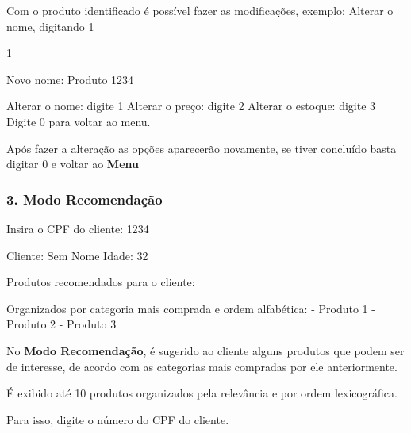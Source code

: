 


\begin{DoxyItemize}
\item Com o produto identificado é possível fazer as modificações, exemplo\+: Alterar o nome, digitando 1 ~\newline

\end{DoxyItemize}

\begin{DoxyVerb}1

Novo nome: Produto 1234

Alterar o nome: digite 1
Alterar o preço: digite 2
Alterar o estoque: digite 3
Digite 0 para voltar ao menu.
\end{DoxyVerb}



\begin{DoxyItemize}
\item Após fazer a alteração as opções aparecerão novamente, se tiver concluído basta digitar 0 e voltar ao {\bfseries Menu} 


\end{DoxyItemize}

\subsubsection*{3. Modo Recomendação}

\begin{DoxyVerb}

Insira o CPF do cliente: 1234

Cliente: Sem Nome
Idade: 32

Produtos recomendados para o cliente:

Organizados por categoria mais comprada e ordem alfabética:
- Produto 1
- Produto 2
- Produto 3
\end{DoxyVerb}



\begin{DoxyItemize}
\item No {\bfseries Modo Recomendação}, é sugerido ao cliente alguns produtos que podem ser de interesse, de acordo com as categorias mais compradas por ele anteriormente.
\item É exibido até 10 produtos organizados pela relevância e por ordem lexicográfica.
\item Para isso, digite o número do C\+PF do cliente. ~\newline

\end{DoxyItemize}

